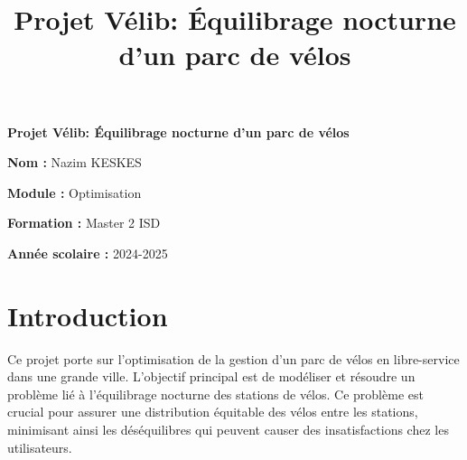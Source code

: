 \documentclass{article}
\title{Projet Vélib: Équilibrage nocturne d’un parc de vélos}
\author{}
\date{}
\begin{document}
\begin{titlepage}
    \centering
    \vspace*{4cm}
    {\Huge \bfseries Projet Vélib: Équilibrage nocturne d’un parc de vélos \par}
    \vspace{2cm}
    {\Large \textbf{Nom :} Nazim KESKES \par}
    \vspace{0.5cm}
    {\Large \textbf{Module :} Optimisation \par}
    \vspace{0.5cm}
    {\Large \textbf{Formation :} Master 2 ISD \par}
    \vspace{0.5cm}
    {\Large \textbf{Année scolaire :} 2024-2025 \par}
    \vfill
\end{titlepage}

\setcounter{page}{1}
\tableofcontents
\newpage
{}

\maketitle

\section{Introduction}
Ce projet porte sur l'optimisation de la gestion d'un parc de vélos en libre-service dans une grande ville. L'objectif principal est de modéliser et résoudre un problème lié à l'équilibrage nocturne des stations de vélos. Ce problème est crucial pour assurer une distribution équitable des vélos entre les stations, minimisant ainsi les déséquilibres qui peuvent causer des insatisfactions chez les utilisateurs.
\end{document}
